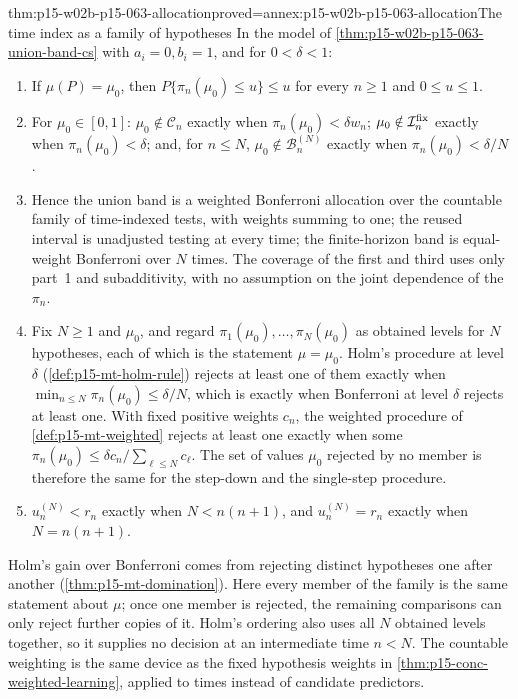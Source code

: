 \begin{hbtheorem}{thm:p15-w02b-p15-063-allocation}{proved=annex:p15-w02b-p15-063-allocation}{The time index as a family of hypotheses}
In the model of \cref{thm:p15-w02b-p15-063-union-band-cs} with
\(a_i=0,b_i=1\), and for \(0<\delta<1\):
\begin{enumerate}
\item If \(\mu(P)=\mu_0\), then \(P\{\pi_n(\mu_0)\leq u\}\leq u\) for every
 \(n\geq1\) and \(0\leq u\leq1\).
\item For \(\mu_0\in[0,1]\): \(\mu_0\notin\mathcal C_n\) exactly when
 \(\pi_n(\mu_0)<\delta w_n\); \(\mu_0\notin\mathcal I^{\rm fix}_n\)
 exactly when \(\pi_n(\mu_0)<\delta\); and, for \(n\leq N\),
 \(\mu_0\notin\mathcal B^{(N)}_n\) exactly when
 \(\pi_n(\mu_0)<\delta/N\).
\item Hence the union band is a weighted Bonferroni allocation over the
 countable family of time-indexed tests, with weights summing to one; the
 reused interval is unadjusted testing at every time; the finite-horizon
 band is equal-weight Bonferroni over \(N\) times. The coverage of the
 first and third uses only part~1 and subadditivity, with no assumption on
 the joint dependence of the \(\pi_n\).
\item Fix \(N\geq1\) and \(\mu_0\), and regard \(\pi_1(\mu_0),\ldots,
 \pi_N(\mu_0)\) as obtained levels for \(N\) hypotheses, each of which is
 the statement \(\mu=\mu_0\). Holm's procedure at level \(\delta\)
 (\cref{def:p15-mt-holm-rule}) rejects at least one of them exactly when
 \(\min_{n\leq N}\pi_n(\mu_0)\leq\delta/N\), which is exactly when
 Bonferroni at level \(\delta\) rejects at least one. With fixed positive
 weights \(c_n\), the weighted procedure of \cref{def:p15-mt-weighted}
 rejects at least one exactly when some
 \(\pi_n(\mu_0)\leq\delta c_n/\sum_{\ell\leq N}c_\ell\). The set of values
 \(\mu_0\) rejected by no member is therefore the same for the step-down
 and the single-step procedure.
\item \(u^{(N)}_n<r_n\) exactly when \(N<n(n+1)\), and
 \(u^{(N)}_n=r_n\) exactly when \(N=n(n+1)\).
\end{enumerate}
\end{hbtheorem}

Holm's gain over Bonferroni comes from rejecting distinct hypotheses
one after another (\cref{thm:p15-mt-domination}). Here every member of the
family is the same statement about \(\mu\); once one member is rejected,
the remaining comparisons can only reject further copies of it. Holm's
ordering also uses all \(N\) obtained levels together, so it supplies no
decision at an intermediate time \(n<N\). The countable weighting is the
same device as the fixed hypothesis weights in
\cref{thm:p15-conc-weighted-learning}, applied to times instead of
candidate predictors.

